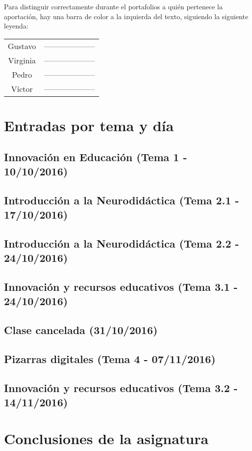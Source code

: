 Para distinguir correctamente durante el portafolios a quién pertenece la aportación, hay una barra de color a la izquierda del texto, siguiendo la siguiente leyenda:

\begin{table}[h!]
\centering
\begin{tabular}{|c|c|}
\hline
Gustavo & \colorbox{\guscolor}{--------------------}\\
Virginia & \colorbox{\virgicolor}{--------------------}\\
Pedro & \colorbox{\pedrocolor}{--------------------}\\
Víctor & \colorbox{\victorcolor}{--------------------}\\\hline
\end{tabular}
\end{table}

\section{Entradas por tema y día}

\subsection{Innovación en Educación (Tema 1 - 10/10/2016)}


\subsection{Introducción a la Neurodidáctica (Tema 2.1 - 17/10/2016)}


\subsection{Introducción a la Neurodidáctica (Tema 2.2 - 24/10/2016)}


\subsection{Innovación y recursos educativos (Tema 3.1 - 24/10/2016)}


\subsection{Clase cancelada (31/10/2016)}

\subsection{Pizarras digitales (Tema 4 - 07/11/2016)}


\subsection{Innovación y recursos educativos (Tema 3.2 - 14/11/2016)}


\newpage
\section{Conclusiones de la asignatura}

